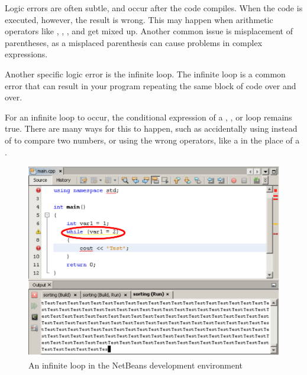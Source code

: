 Logic errors are often subtle, and occur after the code compiles. 
When the code is executed, however, the result is wrong. 
This may happen when arithmetic operators like \Code{+}, \Code{-}, \Code{*}, and \Code{/} get mixed up. 
Another common issue is misplacement of parentheses, as a misplaced parenthesis can cause problems in complex expressions. 


Another specific logic error is the infinite loop. 
The infinite loop is a common error that can result in your program repeating the same block of code over and over. 

For an infinite loop to occur, the conditional expression of a , , or  loop remains true. 
There are many ways for this to happen, such as accidentally using \Code{=} instead of \Code{==} to compare two numbers, or using the wrong operators, like a \Code{>} in the place of a \Code{<}.

\begin{figure}[tbh]
  \centering
  \includegraphics[width=\textwidth]{diagrams/fig-netbeans-infinite-loop.pdf}
  \caption{An infinite loop in the NetBeans development environment} \label{fig-netbeans-infinite-loop} 
\end{figure}


